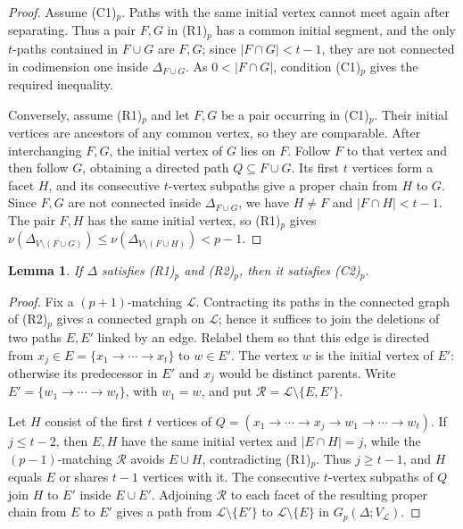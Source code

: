 \documentclass{amsart}
\newtheorem{Lemma}[Theorem]{Lemma}
\theoremstyle{definition}
\theoremstyle{remark}
\begin{document}
\begin{proof}
Assume (C1)$_p$. Paths with the same initial vertex cannot meet again after separating. Thus a pair $F,G$ in (R1)$_p$ has a common initial segment, and the only $t$-paths contained in $F\cup G$ are $F,G$; since $|F\cap G|<t-1$, they are not connected in codimension one inside $\Delta_{F\cup G}$. As $0<|F\cap G|$, condition (C1)$_p$ gives the required inequality.

Conversely, assume (R1)$_p$ and let $F,G$ be a pair occurring in (C1)$_p$. Their initial vertices are ancestors of any common vertex, so they are comparable. After interchanging $F,G$, the initial vertex of $G$ lies on $F$. Follow $F$ to that vertex and then follow $G$, obtaining a directed path $Q\subseteq F\cup G$. Its first $t$ vertices form a facet $H$, and its consecutive $t$-vertex subpaths give a proper chain from $H$ to $G$. Since $F,G$ are not connected inside $\Delta_{F\cup G}$, we have $H\neq F$ and $|F\cap H|<t-1$. The pair $F,H$ has the same initial vertex, so (R1)$_p$ gives $\nu(\Delta_{V\setminus(F\cup G)})\leq\nu(\Delta_{V\setminus(F\cup H)})<p-1$.
\end{proof}

\begin{Lemma}\label{lem:rooted-C2}
If $\Delta$ satisfies \textnormal{(R1)$_p$} and \textnormal{(R2)$_p$}, then it satisfies \textnormal{(C2)$_p$}.
\end{Lemma}

\begin{proof}
Fix a $(p+1)$-matching $\mathcal L$. Contracting its paths in the connected graph of (R2)$_p$ gives a connected graph on $\mathcal L$; hence it suffices to join the deletions of two paths $E,E'$ linked by an edge. Relabel them so that this edge is directed from $x_j\in E=\{x_1\to\cdots\to x_t\}$ to $w\in E'$. The vertex $w$ is the initial vertex of $E'$: otherwise its predecessor in $E'$ and $x_j$ would be distinct parents. Write $E'=\{w_1\to\cdots\to w_t\}$, with $w_1=w$, and put $\mathcal R=\mathcal L\setminus\{E,E'\}$.

Let $H$ consist of the first $t$ vertices of $Q=(x_1\to\cdots\to x_j\to w_1\to\cdots\to w_t)$. If $j\leq t-2$, then $E,H$ have the same initial vertex and $|E\cap H|=j$, while the $(p-1)$-matching $\mathcal R$ avoids $E\cup H$, contradicting (R1)$_p$. Thus $j\geq t-1$, and $H$ equals $E$ or shares $t-1$ vertices with it. The consecutive $t$-vertex subpaths of $Q$ join $H$ to $E'$ inside $E\cup E'$. Adjoining $\mathcal R$ to each facet of the resulting proper chain from $E$ to $E'$ gives a path from $\mathcal L\setminus\{E'\}$ to $\mathcal L\setminus\{E\}$ in $G_p(\Delta;V_{\mathcal L})$.
\end{proof}
\end{document}
